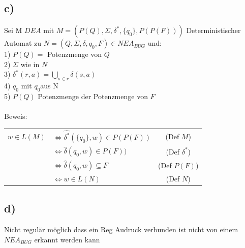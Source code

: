 \subsection*{c)}
Sei M $DEA$  mit $M=(P (Q), \Sigma , \delta^{*} , \{ q_0\}, P(P (F)))$ Deterministischer Automat zu $N=(Q, \Sigma , \delta , q_0,F) \in NEA_{BUG}$ und:\\
 1) $P(Q) =$ Potenzmenge von $Q $\\
 2) $\Sigma$ wie in $N$\\
 3) $ \delta^{*}(r,a) = \bigcup_{s \in r} \delta(s,a)$\\
 4) ${q_0} $ mit $q_0 $aus N\\
 5) $P (Q) $ Potenzmenge der Potenzmenge von $F$\\
 \\
Beweis:\\
\begin{tabular}{l  l  c}
$w \in L(M)$ & $\Leftrightarrow \widehat{\delta^*} (\{q_0\} , w) \in P(P(F))$ & (Def $M$) \\
& $\Leftrightarrow \widehat{\delta} (q_0 , w) \in  P(F)) $ & (Def $ \delta^* $)\\
& $\Leftrightarrow \widehat{\delta} (q_0 , w) \subseteq  F $ & (Def $ P(F) $)\\
& $ \Leftrightarrow w \in L(N) $ & (Def $ N $)\\
\end{tabular} 
 
\subsection*{d)} 
 Nicht regulär möglich dass ein Reg Audruck verbunden ist nicht von einem $ NEA_{BUG}$ erkannt werden kann
